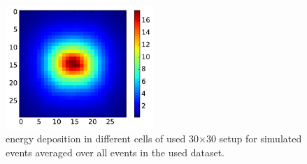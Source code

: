 \begin{figure}
\begin{center}
\includegraphics[width=0.5\textwidth]{figures/mean_cluster.pdf}
\caption{energy deposition in different cells of used 30$\times $30 setup for \geant simulated events averaged over all events in the used dataset. \label{fig:real-imgs}}
\end{center}
\end{figure}